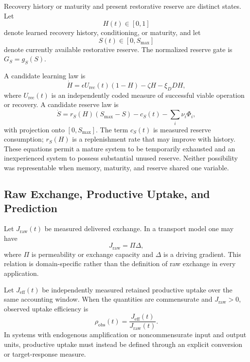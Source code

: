 Recovery history or maturity and present restorative reserve are distinct states. Let
\[
    H(t)\in[0,1]
\]
denote learned recovery history, conditioning, or maturity, and let
\[
    S(t)\in[0,S_{\max}]
\]
denote currently available restorative reserve. The normalized reserve gate is \(G_S=g_S(S)\).

A candidate learning law is
\begin{equation}
    \dot H
    =
    \epsilon U_{\mathrm{rec}}(t)(1-H)
    -
    \zeta H
    -
    \xi_D D H,
    \label{eq:history-dynamics}
\end{equation}
where \(U_{\mathrm{rec}}(t)\) is an independently coded measure of successful viable operation or recovery. A candidate reserve law is
\begin{equation}
    \dot S
    =
    r_S(H)(S_{\max}-S)
    -
    c_S(t)
    -
    \sum_i\nu_i\Phi_i,
    \label{eq:reserve-dynamics}
\end{equation}
with projection onto \([0,S_{\max}]\). The term \(c_S(t)\) is measured reserve consumption; \(r_S(H)\) is a replenishment rate that may improve with history. These equations permit a mature system to be temporarily exhausted and an inexperienced system to possess substantial unused reserve. Neither possibility was representable when memory, maturity, and reserve shared one variable.

\subsection{Raw Exchange, Productive Uptake, and Prediction}

Let \(J_{\mathrm{raw}}(t)\) be measured delivered exchange. In a transport model one may have
\begin{equation}
    J_{\mathrm{raw}}
    =
    \Pi\Delta,
    \label{eq:raw-exchange}
\end{equation}
where \(\Pi\) is permeability or exchange capacity and \(\Delta\) is a driving gradient. This relation is domain-specific rather than the definition of raw exchange in every application.

Let \(J_{\mathrm{eff}}(t)\) be independently measured retained productive uptake over the same accounting window. When the quantities are commensurate and \(J_{\mathrm{raw}}>0\), observed uptake efficiency is
\begin{equation}
    \rho_{\mathrm{obs}}(t)
    =
    \frac{J_{\mathrm{eff}}(t)}{J_{\mathrm{raw}}(t)}.
    \label{eq:effective-exchange}
\end{equation}
In systems with endogenous amplification or noncommensurate input and output units, productive uptake must instead be defined through an explicit conversion or target-response measure.

